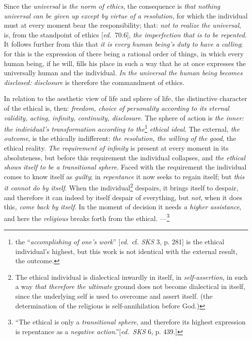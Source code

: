 \documentclass[12pt,a4paper,openany]{book}
\newcommand{\kpage}[1]{\marginnote{\footnotesize\textit{[#1]}}}
\newcommand{\ed}[1]{{\small[\textit{ed.}\ #1]}}
\begin{document}
Since the \emph{universal} is \emph{the norm of ethics}, the consequence is \emph{that nothing universal can be given up
except by virtue of a resolution}, for which the individual must at every moment
bear the responsibility; that: \emph{not to realize the universal}, is, from the standpoint
of ethics \ed{70.6}, \emph{the imperfection that is to be repented}. It follows further
from this that \emph{it is every human being's duty to have a calling}; for this is
the expression of there being a rational order of things, in which every
human being, if he will, fills his place in such a way that he
at once expresses the universally human and the individual.
\kpage{135}\emph{In the universal the human being becomes disclosed: disclosure} is therefore the
commandment of ethics.

In relation to the aesthetic view of life and sphere of life, the
distinctive character of the ethical is, then: \emph{freedom, choice of personality according to
its eternal validity, acting, infinity, continuity, disclosure}.
The sphere of action is \emph{the inner: the individual's transformation according to the}\footnote[61]{
the ``\emph{accomplishing of one's work}'' \ed{cf. \emph{SKS} 3, p. 281} is the ethical individual's highest, but
this work is not identical with the external result, the outcome.}
\emph{ethical
ideal}. The external, \emph{the outcome}, is the ethically indifferent: \emph{the resolution, the willing
of the good}, the ethical reality. \emph{The requirement of infinity} is present at every
moment in its absoluteness, but before this requirement the individual
collapses, and \emph{the ethical shows itself to be a transitional sphere}. Faced with the requirement
the individual comes to know itself as \emph{guilty}; in \emph{repentance} it now seeks
to regain itself; but \emph{this it cannot do by itself}. When the individual\footnote[62]{
The ethical individual is dialectical inwardly in itself, in \emph{self-assertion}, in such a way \emph{that
therefore the ultimate} ground does not become dialectical in itself, since the underlying self is used
to overcome and assert itself. (the determination of the religious is self-annihilation
before God.)}
despairs, it brings itself to despair, and therefore it can indeed
by itself despair of everything, but \emph{not}, when it does this\emph{, come back
by itself}. In the moment of decision it needs \emph{a higher assistance}, and
here the \emph{religious} breaks forth from the ethical. ---\footnote[63]{
``The ethical is only a \emph{transitional sphere}, and therefore its highest expression is repentance
as a \emph{negative action}.''\ed{\emph{SKS} 6, p. 439.}}
\end{document}
